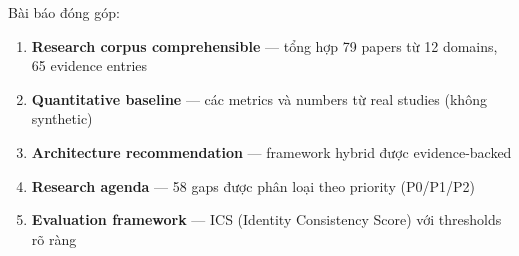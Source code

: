 Bài báo đóng góp:
\begin{enumerate}
    \item \textbf{Research corpus comprehensible} --- tổng hợp 79 papers từ 12 domains, 65 evidence entries
    \item \textbf{Quantitative baseline} --- các metrics và numbers từ real studies (không synthetic)
    \item \textbf{Architecture recommendation} --- framework hybrid được evidence-backed
    \item \textbf{Research agenda} --- 58 gaps được phân loại theo priority (P0/P1/P2)
    \item \textbf{Evaluation framework} --- ICS (Identity Consistency Score) với thresholds rõ ràng
\end{enumerate}

